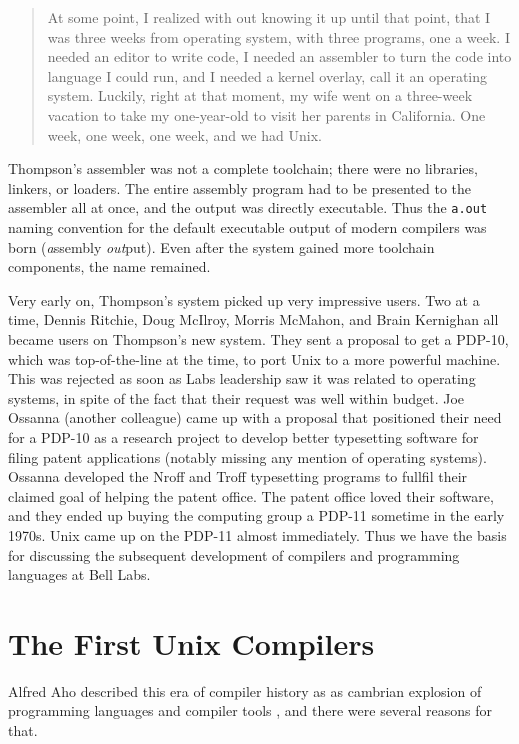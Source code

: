 \begin{quotation}
At some point, I realized with out knowing it up until that point, that I was 
three weeks from operating system, with three programs, one a week. I needed an 
editor to write code, I needed an assembler to turn the code into language I 
could run, and I needed a kernel overlay, call it an operating system.  
Luckily, right at that moment, my wife went on a three-week vacation to take my 
one-year-old to visit her parents in California. One week, one week, one week, 
and we had Unix.
\end{quotation}

Thompson's assembler was not a complete toolchain; there were no libraries, linkers, or loaders.
The entire assembly program had to be presented to the assembler all at once,
and the output was directly executable. Thus the \texttt{a.out} naming convention for
the default executable output of modern compilers was born (\textit{a}ssembly \textit{out}put).
Even after the system gained more toolchain components, the name remained.

Very early on, Thompson's system picked up very impressive users.
Two at a time, Dennis Ritchie, Doug McIlroy, Morris McMahon, and Brain Kernighan
all became users on Thompson's new system.
They sent a proposal to get a PDP-10, which was top-of-the-line at the time,
to port Unix to a more powerful machine.
This was rejected as soon as Labs leadership saw it was related to operating systems,
in spite of the fact that their request was well within budget.
Joe Ossanna (another colleague) came up with a proposal that
positioned their need for a PDP-10 as a research project to develop better typesetting
software for filing patent applications (notably missing any mention of operating
systems).
Ossanna developed the Nroff and Troff typesetting programs to fullfil their claimed
goal of helping the patent office.
The patent office loved their software, and they ended up buying the computing group
a PDP-11 sometime in the early 1970s.
Unix came up on the PDP-11 almost immediately.
Thus we have the basis for discussing the subsequent development of compilers
and programming languages at Bell Labs.



\section{The First Unix Compilers}

Alfred Aho described this era of compiler history
as as cambrian explosion of programming languages and compiler tools
\cite{aho_bell_labs_role_in_programming_languages_2025},
and there were several reasons for that.

